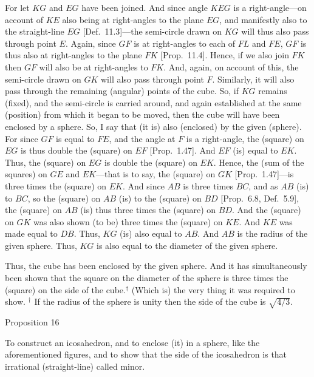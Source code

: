 For let $KG$ and $EG$ have been joined. And since
angle $KEG$ is a right-angle---on account of $KE$ also being at right-angles
to the plane $EG$, and manifestly also to the straight-line $EG$ [Def.~11.3]---the semi-circle drawn on $KG$ will thus also pass through
point $E$. Again, since $GF$ is at right-angles to each of $FL$
and $FE$, $GF$ is thus also at right-angles to the plane $FK$ [Prop.~11.4]. 
Hence, if we also join $FK$ then $GF$ will also be at right-angles to
$FK$. And, again, on account of this, the semi-circle drawn on
$GK$ will also pass through point $F$. Similarly, it will also pass through
the remaining (angular) points of the cube. So, if $KG$ remains (fixed), 
and the semi-circle is carried around, and again established at the
same (position) from which it began to be moved, then the cube will
have been enclosed by a sphere. So, I say that (it is) also (enclosed)
by the given (sphere). For since $GF$ is equal to $FE$, and the
angle at $F$ is a right-angle, the (square) on $EG$ is thus double
the (square) on $EF$ [Prop.~1.47]. And $EF$ (is) equal to
$EK$. Thus, the (square) on $EG$ is double the (square) on $EK$.
Hence, the (sum of the squares) on $GE$ and $EK$---that is to say, the
(square) on $GK$ [Prop.~1.47]---is three times the  (square) on $EK$. And since
$AB$ is three times $BC$, and as $AB$ (is) to $BC$, so the
(square) on $AB$ (is) to the (square) on $BD$ [Prop.~6.8, Def.~5.9], 
the (square) on $AB$ (is) thus three times the (square) on $BD$. 
And the (square) on $GK$ was also shown (to be) three times
the (square) on $KE$. And $KE$ was made equal to $DB$. 
Thus, $KG$ (is) also equal to $AB$. And $AB$ is the
radius of the given sphere. Thus, $KG$ is also equal to the diameter of the
given sphere.

Thus, the cube has been enclosed by the given sphere. And it
has simultaneously been shown that the square on the diameter of
the sphere is three times the (square) on the side of the cube.$^\dag$ (Which is)
the very thing it was required to show.
{\footnotesize\noindent$^\dag$ If the radius of the sphere is unity 
then the side of the cube is $\sqrt{4/3}$.}


\begin{center}
{\large Proposition 16}
\end{center}

To construct an icosahedron, and to enclose (it) in a sphere, like the
aforementioned figures, and to show that the side of the
icosahedron is that irrational (straight-line) called minor.


